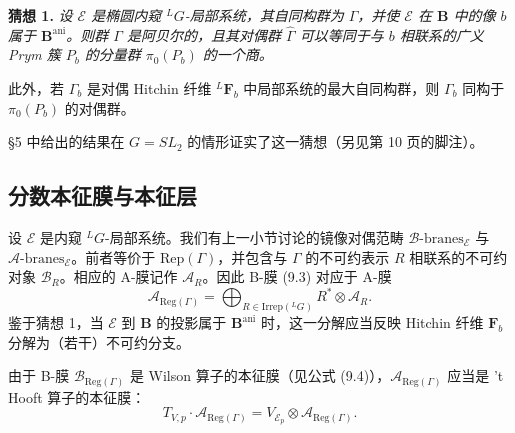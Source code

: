 \documentclass[11pt,a4paper]{article}
\newenvironment{namedconj}[1]
  {\par\medskip\noindent\textbf{猜想 #1.}\itshape\ignorespaces}
  {\par\medskip}
\begin{document}
\begin{namedconj}{1}
设 $\mathcal{E}$ 是椭圆内窥 ${}^{L}G$-局部系统，其自同构群为 $\Gamma$，并使 $\mathcal{E}$ 在 $\boldsymbol{B}$ 中的像 $b$ 属于 $\boldsymbol{B}^{\mathrm{ani}}$。则群 $\Gamma$ 是阿贝尔的，且其对偶群 $\widehat{\Gamma}$ 可以等同于与 $b$ 相联系的广义 Prym 簇 $P_b$ 的分量群 $\pi_0(P_b)$ 的一个商。

此外，若 $\Gamma_b$ 是对偶 Hitchin 纤维 ${}^{L}\boldsymbol{F}_b$ 中局部系统的最大自同构群，则 $\Gamma_b$ 同构于 $\pi_0(P_b)$ 的对偶群。
\end{namedconj}


§5 中给出的结果在 $G=SL_2$ 的情形证实了这一猜想（另见第 10 页的脚注）。

\subsection{分数本征膜与本征层}

设 $\mathcal{E}$ 是内窥 ${}^{L}G$-局部系统。我们有上一小节讨论的镜像对偶范畴 $\mathcal{B}\text{-branes}_{\mathcal{E}}$ 与 $\mathcal{A}\text{-branes}_{\mathcal{E}}$。前者等价于 $\mathrm{Rep}(\Gamma)$，并包含与 $\Gamma$ 的不可约表示 $R$ 相联系的不可约对象 $\mathcal{B}_R$。相应的 A-膜记作 $\mathcal{A}_R$。因此 B-膜 (9.3) 对应于 A-膜
\begin{equation}\tag{9.5}
\mathcal{A}_{\mathrm{Reg}(\Gamma)} = \bigoplus_{R\in\mathrm{Irrep}({}^{L}G)}R^*\otimes\mathcal{A}_R.
\end{equation}
鉴于猜想 1，当 $\mathcal{E}$ 到 $\boldsymbol{B}$ 的投影属于 $\boldsymbol{B}^{\mathrm{ani}}$ 时，这一分解应当反映 Hitchin 纤维 $\boldsymbol{F}_b$ 分解为（若干）不可约分支。

由于 B-膜 $\mathcal{B}_{\mathrm{Reg}(\Gamma)}$ 是 Wilson 算子的本征膜（见公式 (9.4)），$\mathcal{A}_{\mathrm{Reg}(\Gamma)}$ 应当是 't Hooft 算子的本征膜：
\begin{equation}\tag{9.6}
T_{V,p}\cdot\mathcal{A}_{\mathrm{Reg}(\Gamma)} = V_{\mathcal{E}_p}\otimes\mathcal{A}_{\mathrm{Reg}(\Gamma)}.
\end{equation}
\end{document}
